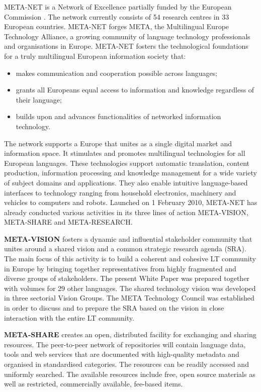 \begin{multicols}{2}
META-NET is a Network of Excellence partially funded by the European Commission \cite{rehm2011}. The network currently consists of 54 research centres in 33 European countries. META-NET forges META, the Multilingual Europe Technology Alliance, a growing community of language technology professionals and organisations in Europe. META-NET fosters the technological foundations for a truly multilingual European information society that:

\begin{itemize}
\item makes communication and cooperation possible across languages;
\item grants all Europeans equal access to information and knowledge regardless of their language;
\item builds upon and advances functionalities of networked information technology.
\end{itemize}

The network supports a Europe that unites as a single digital market and information space. It stimulates and promotes multilingual technologies for all European languages. These technologies support automatic translation, content production, information processing and knowledge management for a wide variety of subject domains and applications. They also enable intuitive language-based interfaces to technology ranging from household electronics, machinery and vehicles to computers and robots.
Launched on 1 February 2010, META-NET has already conducted various activities in its three lines of action META-VISION, META-SHARE and META-RESEARCH.

\textbf{META-VISION} fosters a dynamic and influential stakeholder community that unites around a shared vision and a common strategic research agenda (SRA). The main focus of this activity is to build a coherent and cohesive LT community in Europe by bringing together representatives from highly fragmented and diverse groups of stakeholders. The present White Paper was prepared together with volumes for 29 other languages. The shared technology vision was developed in three sectorial Vision Groups. The META Technology Council was established in order to discuss and to prepare the SRA based on the vision in close interaction with the entire LT community.

\textbf{META-SHARE} creates an open, distributed facility for exchanging and sharing resources. The peer-to-peer network of repositories will contain language data, tools and web services that are documented with high-quality metadata and organised in standardised categories. The resources can be readily accessed and uniformly searched. The available resources include free, open source materials as well as restricted, commercially available, fee-based items.


\end{multicols}
